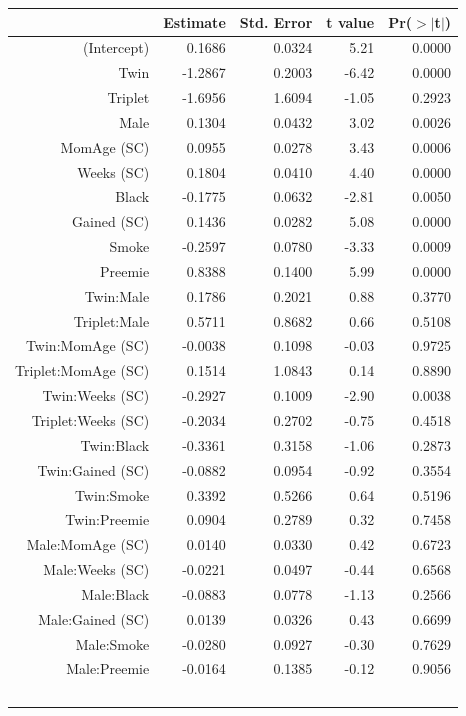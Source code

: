 \documentclass{article}\usepackage[]{graphicx}\usepackage[]{xcolor}
\begin{document}
\begin{table}[H]
\centering
\begin{tabular}{rrrrr}
  \hline
 & Estimate & Std. Error & t value & Pr($>$$|$t$|$) \\ 
  \hline
(Intercept) & 0.1686 & 0.0324 & 5.21 & 0.0000 \\ 
  Twin & -1.2867 & 0.2003 & -6.42 & 0.0000 \\ 
  Triplet & -1.6956 & 1.6094 & -1.05 & 0.2923 \\ 
  Male & 0.1304 & 0.0432 & 3.02 & 0.0026 \\ 
  MomAge (SC) & 0.0955 & 0.0278 & 3.43 & 0.0006 \\ 
  Weeks (SC) & 0.1804 & 0.0410 & 4.40 & 0.0000 \\ 
  Black & -0.1775 & 0.0632 & -2.81 & 0.0050 \\ 
  Gained (SC) & 0.1436 & 0.0282 & 5.08 & 0.0000 \\ 
  Smoke & -0.2597 & 0.0780 & -3.33 & 0.0009 \\ 
  Preemie & 0.8388 & 0.1400 & 5.99 & 0.0000 \\ 
  Twin:Male & 0.1786 & 0.2021 & 0.88 & 0.3770 \\ 
  Triplet:Male & 0.5711 & 0.8682 & 0.66 & 0.5108 \\ 
  Twin:MomAge (SC) & -0.0038 & 0.1098 & -0.03 & 0.9725 \\ 
  Triplet:MomAge (SC) & 0.1514 & 1.0843 & 0.14 & 0.8890 \\ 
  Twin:Weeks (SC) & -0.2927 & 0.1009 & -2.90 & 0.0038 \\ 
  Triplet:Weeks (SC) & -0.2034 & 0.2702 & -0.75 & 0.4518 \\ 
  Twin:Black & -0.3361 & 0.3158 & -1.06 & 0.2873 \\ 
  Twin:Gained (SC) & -0.0882 & 0.0954 & -0.92 & 0.3554 \\ 
  Twin:Smoke & 0.3392 & 0.5266 & 0.64 & 0.5196 \\ 
  Twin:Preemie & 0.0904 & 0.2789 & 0.32 & 0.7458 \\ 
  Male:MomAge (SC) & 0.0140 & 0.0330 & 0.42 & 0.6723 \\ 
  Male:Weeks (SC) & -0.0221 & 0.0497 & -0.44 & 0.6568 \\ 
  Male:Black & -0.0883 & 0.0778 & -1.13 & 0.2566 \\ 
  Male:Gained (SC) & 0.0139 & 0.0326 & 0.43 & 0.6699 \\ 
  Male:Smoke & -0.0280 & 0.0927 & -0.30 & 0.7629 \\ 
  Male:Preemie & -0.0164 & 0.1385 & -0.12 & 0.9056 \\ 
$$
\end{tabular}
\end{table}
\end{document}
